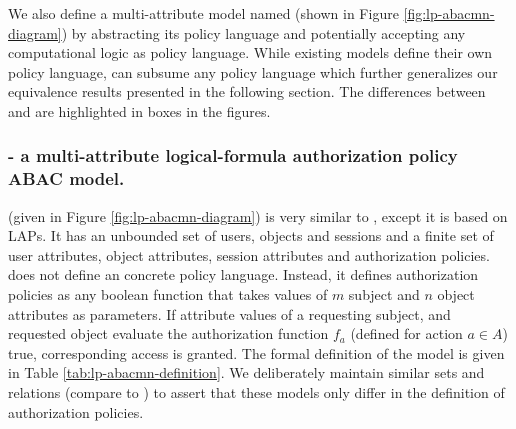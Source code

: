 

	
		
	
	\label{sec:models}
	
	We also define a multi-attribute \LPModels{} model named \LPMN{} (shown in Figure \ref{fig:lp-abacmn-diagram})  by abstracting its policy language and potentially accepting any computational logic as policy language. While existing \LPModels{} models  define their own policy language, \LPMN{} can subsume any policy language which further generalizes our equivalence results presented in the following section.  The differences between \EPMNModel{} and \LPMN{} are highlighted in boxes in the figures. 
	


		
	
	
	
	


\subsubsection{\LPMN{} - a multi-attribute logical-formula authorization policy ABAC model.}
	\label{sec:lpmodels}
	 
	 

	 \LPMN{} (given in Figure \ref{fig:lp-abacmn-diagram}) is very similar to \EPMNModel{}, except it is based on LAPs.  It has an unbounded set of users, objects and sessions and a finite set of user attributes, object attributes, session attributes and authorization policies. \LPMN{} does not define an concrete policy language. Instead, it defines  authorization policies as any boolean function that takes values of $m$ subject and $n$ object attributes as parameters. If attribute values of a requesting subject, and requested object evaluate the authorization function $f_a$ (defined for action $a \in A$) true, corresponding access is granted. The formal definition of the model is given in Table \ref{tab:lp-abacmn-definition}. We deliberately maintain similar sets and relations (compare to \EPMNModel{})  to assert that these models only differ in the definition of authorization policies. 
	 

	
